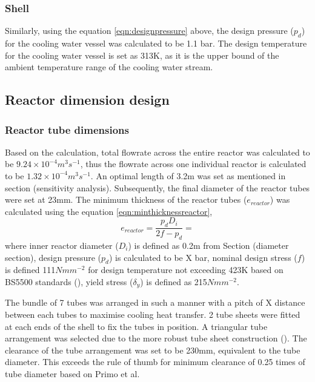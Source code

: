 \subsubsection{Shell}
Similarly, using the equation \ref{eqn:designpressure} above, the design pressure ($p_d$) for the cooling water vessel was calculated to be 1.1 bar. The design temperature for the cooling water vessel is set as 313K, as it is the upper bound of the ambient temperature range of the cooling water stream. 

\subsection{Reactor dimension design}
\label{sec:reactordimensions}

\subsubsection{Reactor tube dimensions}
Based on the calculation, total flowrate across the entire reactor was calculated to be $9.24 \times 10^{-4} m^3s^{-1}$, thus the flowrate across one individual reactor is calculated to be  $1.32 \times 10^{-4} m^3s^{-1}$. An optimal length of 3.2m was set as mentioned in section (sensitivity analysis). Subsequently, the final diameter of the reactor tubes were set at 23mm.  
The minimum thickness of the reactor tubes ($e_{reactor}$) was calculated using the equation \ref{eqn:minthicknessreactor},
\begin{equation}
    e_{reactor} = \frac{p_dD_i}{2f-p_d} = 
    \label{eqn:minthicknessreactor}
\end{equation}
where inner reactor diameter ($D_i$) is defined as 0.2m from Section (diameter section), design pressure ($p_d$) is calculated to be X bar, nominal design stress ($f$) is defined 111$Nmm^{-2}$ for design temperature not exceeding 423K based on BS5500 standards (), yield stress ($\delta_y$) is defined as 215$Nmm^{-2}$. 


The bundle of 7 tubes was arranged in such a manner with a pitch of X distance between each tubes to maximise cooling heat transfer. 2 tube sheets were fitted at each ends of the shell to fix the tubes in position. A triangular tube arrangement was selected due to the more robust tube sheet construction (). The clearance of the tube arrangement was set to be 230mm, equivalent to the tube diameter. This exceeds the rule of thumb for minimum clearance of 0.25 times of tube diameter based on Primo et al. 



